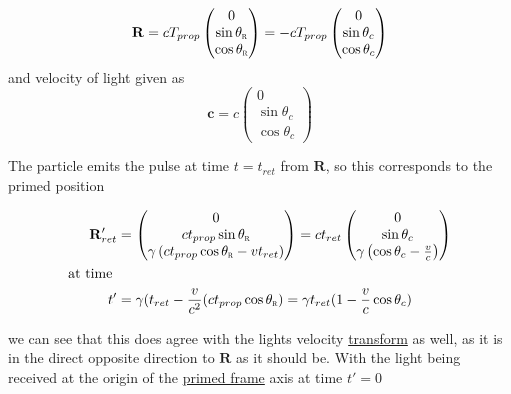 \begin{equation}%
    \mathbf{R} =  c T_{prop} \begin{pmatrix}
    0\\ \sin{\theta_{\scalebox{0.5}{R}}} \\ \cos{\theta_{\scalebox{0.5}{R}}}
    \end{pmatrix}
    =  - c T_{prop} \begin{pmatrix}
    0\\ \sin{\theta_c} \\ \cos{\theta_c}
    \end{pmatrix}
\end{equation}%
and velocity of light given as
\begin{equation}%
    \mathbf{c} = c \begin{pmatrix}
    0\\ \sin{\theta_c} \\ \cos{\theta_c}
    \end{pmatrix}
\end{equation}%

The particle emits the pulse at time $t=t_{ret}$ from $\mathbf{R}$, so this corresponds to the primed position 

\begin{equation}%
\begin{aligned}
     \mathbf{R}'_{ret} &=  \begin{pmatrix}
    0\\ c t_{prop}\sin{\theta_{\scalebox{0.5}{R}}} \\ \gamma \left( c t_{prop}\cos{\theta_{\scalebox{0.5}{R}}} - vt_{ret} \right)\\
    \end{pmatrix} = ct_{ret}
    \begin{pmatrix}
    0\\ \sin{\theta_c} \\ \gamma \left( \cos{\theta_c} - \frac{v}{c} \right)\\
    \end{pmatrix} \\
    \text{at time }& \\
    t' &= 
    \gamma (t_{ret} - \frac{v}{c^2} (c t_{prop}\cos{\theta_{\scalebox{0.5}{R}}}) = 
     \gamma t_{ret}(1-\frac{v}{c}  \cos{\theta_c} )  
\end{aligned}        
\end{equation}%

we can see that this does agree with the lights velocity \hyperlink{def-transform}{transform} as well, as it is in the direct opposite direction to $\mathbf{R}$ as it should be. With the light being received at the origin of the \hyperlink{def-Primed-Frame}{primed frame} axis at time $t'=0$

